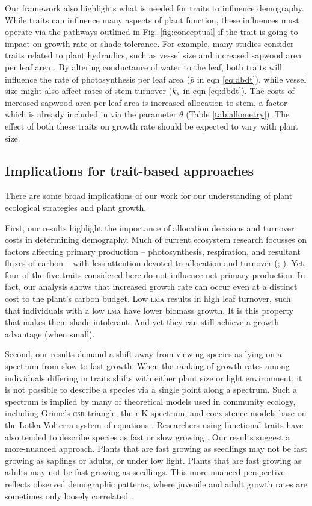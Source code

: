\documentclass[9pt,twocolumn,twoside,lineno]{pnas-new}
\newcommand{\lma}{\textsc{lma}}
\begin{document}
Our framework also highlights what is needed for traits to influence demography. While traits can influence many aspects of plant function, these influences must operate via the pathways outlined in Fig. \ref{fig:conceptual} if the trait is going to impact on growth rate or shade tolerance. For example, many studies consider traits related to plant hydraulics, such as vessel size and increased sapwood area per leaf area \citep{Zanne-2010}. By altering conductance of water to the leaf, both traits will influence the rate of photosynthesis per leaf area ($\bar{p}$ in eqn \ref{eq:dbdt}), while vessel size might also affect rates of stem turnover ($k_{\rm s}$ in eqn \ref{eq:dbdt}). The costs of increased sapwood area per leaf area is increased allocation to stem, a factor which is already included in via the parameter $\theta$ (Table \ref{tab:allometry}). The effect of both these traits on growth rate should be expected to vary with plant size.

\subsection*{Implications for trait-based approaches}
There are some broad implications of our work for our understanding of plant ecological strategies and plant growth.

First, our results highlight the importance of allocation decisions and turnover costs in determining demography. Much of current ecosystem research focusses on factors affecting primary production -- photosynthesis, respiration, and resultant fluxes of carbon -- with less attention devoted to allocation and turnover (\citealp{Friend-2014}; \citealp[for comparisons of models see][]{Sitch-2008, DeKauwe-2014}). Yet, four of the five traits considered here do not influence net primary production. In fact, our analysis shows that increased growth rate can occur even at a distinct cost to the plant's carbon budget. Low {\lma} results in high leaf turnover, such that individuals with a low {\lma} have lower biomass growth. It is this property that makes them shade intolerant. And yet they can still achieve a growth advantage (when small).

Second, our results demand a shift away from viewing species as lying on a spectrum  from slow to fast growth. When the ranking of growth rates among individuals differing in traits shifts with either plant size or light environment, it is not possible to describe a species via a single point along a spectrum. Such a spectrum is implied by many of theoretical models used in community ecology, including Grime's \textsc{csr} triangle, the r-K spectrum, and coexistence models base on the Lotka-Volterra system of equations \citep[e.g.][]{Grime-1977,Chesson-2000}. Researchers using functional traits have also tended to describe species as fast or slow growing \citep{Adler-2014, Diaz-2016}. Our results suggest a more-nuanced approach. Plants that are fast growing as seedlings may not be fast growing as saplings or adults, or under low light. Plants that are fast growing as adults may not be fast growing as seedlings. This more-nuanced perspective reflects observed demographic patterns, where juvenile and adult growth rates are sometimes only loosely correlated \citep{Rees-2001}.
\end{document}

